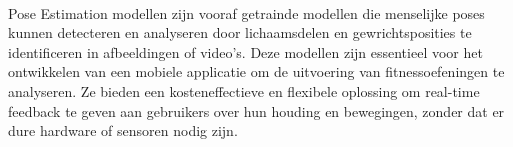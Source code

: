 \paragraph{}%
\label{par:pose-estimation-modellen}

Pose Estimation modellen zijn vooraf getrainde modellen die menselijke poses kunnen detecteren en analyseren door lichaamsdelen en gewrichtsposities te identificeren in afbeeldingen of video’s.
Deze modellen zijn essentieel voor het ontwikkelen van een mobiele applicatie om de uitvoering van fitnessoefeningen te analyseren. 
Ze bieden een kosteneffectieve en flexibele oplossing om real-time feedback te geven aan gebruikers over hun houding en bewegingen, zonder dat er dure hardware of sensoren nodig zijn.

